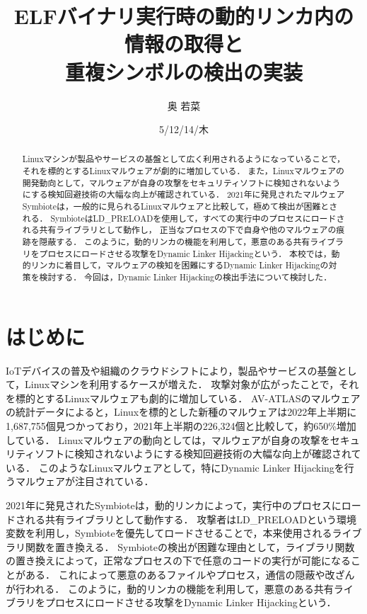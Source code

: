 \documentclass[submit,techreq,noauthor]{eco}	%
\begin{document}
\date   {5/12/14/木}				%
\title  {ELFバイナリ実行時の動的リンカ内の情報の取得と\\重複シンボルの検出の実装}	%
\author {奥 若菜}				%


\begin{abstract}
	Linuxマシンが製品やサービスの基盤として広く利用されるようになっていることで，それを標的とするLinuxマルウェアが劇的に増加している．
  また，Linuxマルウェアの開発動向として，マルウェアが自身の攻撃をセキュリティソフトに検知されないようにする検知回避技術の大幅な向上が確認されている．
  2021年に発見されたマルウェアSymbioteは，一般的に見られるLinuxマルウェアと比較して，極めて検出が困難とされる．
  SymbioteはLD\_PRELOADを使用して，すべての実行中のプロセスにロードされる共有ライブラリとして動作し，
  正当なプロセスの下で自身や他のマルウェアの痕跡を隠蔽する．
  このように，動的リンカの機能を利用して，悪意のある共有ライブラリをプロセスにロードさせる攻撃をDynamic Linker Hijackingという．
  本校では，動的リンカに着目して，マルウェアの検知を困難にするDynamic Linker Hijackingの対策を検討する．
  今回は，Dynamic Linker Hijackingの検出手法について検討した．
\end{abstract}
\maketitle


\section{はじめに}
  IoTデバイスの普及や組織のクラウドシフトにより，製品やサービスの基盤として，Linuxマシンを利用するケースが増えた．
  攻撃対象が広がったことで，それを標的とするLinuxマルウェアも劇的に増加している．
  AV-ATLASのマルウェアの統計データによると，Linuxを標的とした新種のマルウェアは2022年上半期に1,687,755個見つかっており，2021年上半期の226,324個と比較して，約650\%増加している\cite{AV-TEST}．
  Linuxマルウェアの動向としては，マルウェアが自身の攻撃をセキュリティソフトに検知されないようにする検知回避技術の大幅な向上が確認されている\cite{IBM}．
  このようなLinuxマルウェアとして，特にDynamic Linker Hijackingを行うマルウェアが注目されている．

  2021年に発見されたSymbiote\cite{Symbiote}は，動的リンカによって，実行中のプロセスにロードされる共有ライブラリとして動作する．
  攻撃者はLD\_PRELOADという環境変数を利用し，Symbioteを優先してロードさせることで，本来使用されるライブラリ関数を置き換える．
  Symbioteの検出が困難な理由として，ライブラリ関数の置き換えによって，正常なプロセスの下で任意のコードの実行が可能になることがある．
  これによって悪意のあるファイルやプロセス，通信の隠蔽や改ざんが行われる．
  このように，動的リンカの機能を利用して，悪意のある共有ライブラリをプロセスにロードさせる攻撃をDynamic Linker Hijackingという．
\end{document}

